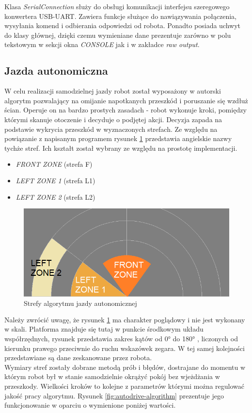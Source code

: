Klasa \emph{SerialConnection} służy do obsługi komunikacji interfejsu szeregowego konwertera USB-UART. Zawiera funkcje służące do nawiązywania połączenia, wysyłania komend i odbierania odpowiedzi od robota. Ponadto posiada uchwyt do klasy głównej, dzięki czemu wymieniane dane prezentuje zarówno w polu tekstowym w sekcji okna \emph{CONSOLE} jak i w zakładce \emph{raw output}.

\subsection{Jazda autonomiczna}
\label{sec:autonomous-drive}
W celu realizacji samodzielnej jazdy robot został wyposażony w autorski algorytm pozwalający na omijanie napotkanych przeszkód i poruszanie się wzdłuż ścian. Operuje on na bardzo prostych zasadach - robot wykonuje kroki, pomiędzy którymi skanuje otoczenie i decyduje o podjętej akcji. Decyzja zapada na podstawie wykrycia przeszkód w wyznaczonych strefach. Ze względu na powiązanie z napisanym programem rysunek \ref{fig:autodrive-zones} przedstawia angielskie nazwy tychże stref. Ich kształt został wybrany ze względu na prostotę implementacji.
\begin{itemize}
    \item \emph{FRONT ZONE} (strefa F)
    \item \emph{LEFT ZONE 1} (strefa L1)
    \item \emph{LEFT ZONE 2} (strefa L2)
\end{itemize}

\begin{figure}[ht]
	\centering
		\includegraphics[width=1\linewidth]{rys/autodrive-zones.png}
	\caption{Strefy algorytmu jazdy autonomicznej}
	\label{fig:autodrive-zones}
\end{figure}

Należy zwrócić uwagę, że rysunek \ref{fig:autodrive-zones} ma charakter poglądowy i nie jest wykonany w skali. Platforma znajduje się tutaj w punkcie środkowym układu współrzędnych, rysunek przedstawia zakres kątów od 0° do 180° , liczonych od kierunku prawego przeciwnie do ruchu wskazówek zegara. W tej samej kolejności przedstawiane są dane zeskanowane przez robota.
\\
Wymiary stref zostały dobrane metodą prób i błędów, dostrajane do momentu w którym robot był w stanie samodzielnie okrążyć pokój bez wjeżdżania w przeszkody.
Wielkości kroków to kolejne z parametrów którymi można regulować jakość pracy algorytmu. Rysunek \ref{fig:autodrive-algorithm} prezentuje jego funkcjonowanie w oparciu o wymienione poniżej wartości.

